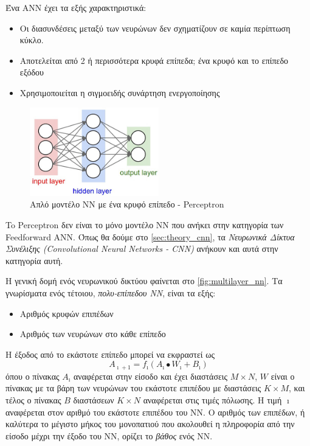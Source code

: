 Ένα ΑΝΝ έχει τα εξής χαρακτηριστικά:
\begin{itemize}
  \item{Οι διασυνδέσεις μεταξύ των νευρώνων δεν σχηματίζουν σε καμία περίπτωση κύκλο.}
  \item{Αποτελείται από 2 ή περισσότερα κρυφά επίπεδα; ένα κρυφό και το επίπεδο εξόδου}
  \item{Χρησιμοποιείται η σιγμοειδής συνάρτηση ενεργοποίησης}
\end{itemize}

\begin{figure}[!ht]
  \centering
  \includegraphics[width=0.5\textwidth]{./images/chapter3/simple_nn.jpg}
  \caption[Απλό μοντέλο NN με ένα κρυφό επίπεδο - Perceptron]{Απλό μοντέλο NN με ένα κρυφό επίπεδο - Perceptron}
  \label{fig:simple_nn}
\end{figure}

To Perceptron δεν είναι το μόνο
μοντέλο ΝΝ που ανήκει στην κατηγορία των Feedforward ANN. Όπως θα δούμε στο
\autoref{sec:theory_cnn}, τα \emph{Νευρωνικά Δίκτυα Συνέλιξης
(Convolutional Neural Networks - CNN)} ανήκουν και αυτά στην κατηγορία αυτή.

Η γενική δομή ενός νευρωνικού δικτύου φαίνεται στο \autoref{fig:multilayer_nn}.
Τα γνωρίσματα ενός τέτοιου, \emph{πολυ-επίπεδου ΝΝ}, είναι τα εξής:
\begin{itemize}
  \item{Αριθμός κρυφών επιπέδων}
  \item{Αριθμός των νευρώνων στο κάθε επίπεδο}
\end{itemize}
Η έξοδος από το εκάστοτε επίπεδο μπορεί να εκφραστεί ως
\[
  A_{\imath+1} = f_{\imath}(A_{\imath} \bullet W_{\imath} + B_{\imath})
\]
όπου ο πίνακας $A_{\imath}$ αναφέρεται στην είσοδο και έχει διαστάσεις $M \times N$,
$W$ είναι ο πίνακας με τα βάρη των νευρώνων του εκάστοτε επιπέδου με διαστάσεις
$K \times M$, και τέλος ο πίνακας $B$ διαστάσεων $K \times N$ αναφέρεται στις
τιμές πόλωσης.
Η τιμή $\imath$ αναφέρεται στον αριθμό του εκάστοτε επιπέδου του ΝΝ.
Ο αριθμός των επιπέδων, ή καλύτερα το μέγιστο μήκος του μονοπατιού που ακολουθεί
η πληροφορία από την είσοδο μέχρι την έξοδο του ΝΝ, ορίζει το \emph{βάθος} ενός ΝΝ.


